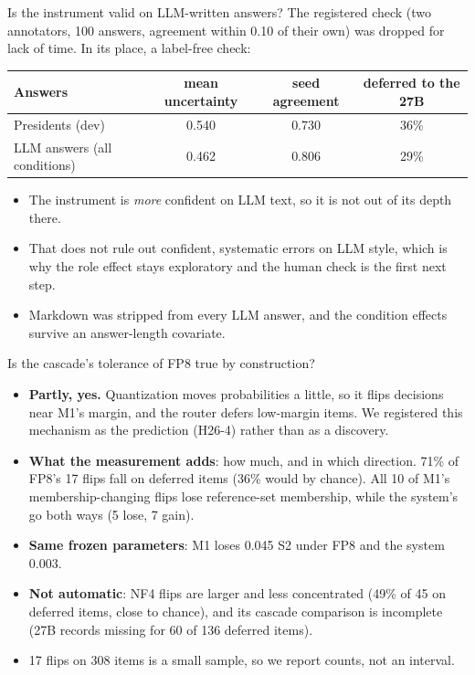 \begin{frame}{Is the instrument valid on LLM-written answers?}
  \small
  The registered check (two annotators, 100 answers, agreement within 0.10 of their own) was dropped for lack of time. In its place, a label-free check:
  \vspace{2mm}

  \centering
  \begin{tabular}{@{}lccc@{}}
    \toprule
    Answers & mean uncertainty & seed agreement & deferred to the 27B \\
    \midrule
    Presidents (dev) & 0.540 & 0.730 & 36\% \\
    LLM answers (all conditions) & 0.462 & 0.806 & 29\% \\
    \bottomrule
  \end{tabular}
  \vspace{2mm}

  \raggedright
  \begin{itemize}
    \item The instrument is \emph{more} confident on LLM text, so it is not out of its depth there.
    \item That does not rule out confident, systematic errors on LLM style, which is why the role effect stays exploratory and the human check is the first next step.
    \item Markdown was stripped from every LLM answer, and the condition effects survive an answer-length covariate.
  \end{itemize}
\end{frame}

\begin{frame}{Is the cascade's tolerance of FP8 true by construction?}
  \small
  \begin{itemize}\setlength{\itemsep}{1.5mm}
    \item \textbf{Partly, yes.} Quantization moves probabilities a little, so it flips decisions near M1's margin, and the router defers low-margin items. We registered this mechanism as the prediction (H26-4) rather than as a discovery.
    \item \textbf{What the measurement adds}: how much, and in which direction. 71\% of FP8's 17 flips fall on deferred items (36\% would by chance). All 10 of M1's membership-changing flips lose reference-set membership, while the system's go both ways (5 lose, 7 gain).
    \item \textbf{Same frozen parameters}: M1 loses 0.045 S2 under FP8 and the system 0.003.
    \item \textbf{Not automatic}: NF4 flips are larger and less concentrated (49\% of 45 on deferred items, close to chance), and its cascade comparison is incomplete (27B records missing for 60 of 136 deferred items).
    \item 17 flips on 308 items is a small sample, so we report counts, not an interval.
  \end{itemize}
\end{frame}

